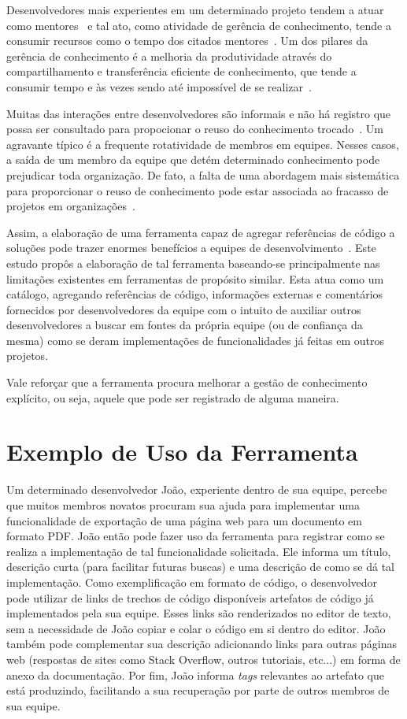 Desenvolvedores mais experientes em um determinado projeto tendem a atuar como mentores~\cite{CubraniC2004} e tal ato, como atividade de gerência de conhecimento, tende a consumir recursos como o tempo dos citados mentores~\cite{Wiig2003}. Um dos pilares da gerência de conhecimento é a melhoria da produtividade através do compartilhamento e transferência eficiente de conhecimento, que tende a consumir tempo e às vezes sendo até impossível de se realizar~\cite{Levy2009}.

Muitas das interações entre desenvolvedores são informais e não há registro que possa ser consultado para propocionar o reuso do conhecimento trocado~\cite{Olson2000}. Um agravante típico é a frequente rotatividade de membros em equipes. Nesses casos, a saída de um membro da equipe que detém determinado conhecimento pode prejudicar toda organização. De fato, a falta de uma abordagem mais sistemática para proporcionar o reuso de conhecimento pode estar associada ao fracasso de projetos em organizações~\cite{Hall2008}.

Assim, a elaboração de uma ferramenta capaz de agregar referências de código a soluções pode trazer enormes benefícios a equipes de desenvolvimento~\cite{CubraniC2004}. Este estudo propôs a elaboração de tal ferramenta baseando-se principalmente nas limitações existentes em ferramentas de propósito similar. Esta atua como um catálogo, agregando referências de código, informações externas e comentários fornecidos por desenvolvedores da equipe com o intuito de auxiliar outros desenvolvedores a buscar em fontes da própria equipe (ou de confiança da mesma) como se deram implementações de funcionalidades já feitas em outros projetos.

Vale reforçar que a ferramenta procura melhorar a gestão de conhecimento explícito, ou seja, aquele que pode ser registrado de alguma maneira.

\section{Exemplo de Uso da Ferramenta}

Um determinado desenvolvedor João, experiente dentro de sua equipe, percebe que muitos membros novatos procuram sua ajuda para implementar uma funcionalidade de exportação de uma página web para um documento em formato PDF. João então pode fazer uso da ferramenta para registrar como se realiza a implementação de tal funcionalidade solicitada. Ele informa um título, descrição curta (para facilitar futuras buscas) e uma descrição de como se dá tal implementação. Como exemplificação em formato de código, o desenvolvedor pode utilizar de links de trechos de código disponíveis artefatos de código já implementados pela sua equipe. Esses links são renderizados no editor de texto, sem a necessidade de João copiar e colar o código em si dentro do editor. João também pode complementar sua descrição adicionando links para outras páginas web (respostas de sites como Stack Overflow, outros tutoriais, etc...) em forma de anexo da documentação. Por fim, João informa \textit{tags} relevantes ao artefato que está produzindo, facilitando a sua recuperação por parte de outros membros de sua equipe.

